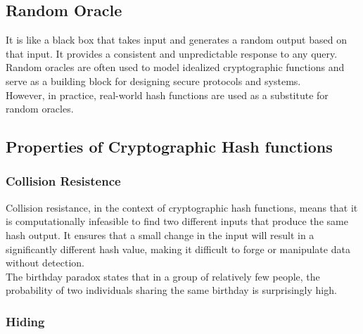 \documentclass{report}
\begin{document}
\subsection{Random Oracle}
It is like a black box that takes input and generates a random output based on that input. It provides a consistent and unpredictable response to any query. Random oracles are often used to model idealized cryptographic functions and serve as a building block for designing secure protocols and systems. \\
However, in practice, real-world hash functions are used as a substitute for random oracles.
\subsection{Properties of Cryptographic Hash functions}
\subsubsection{Collision Resistence}
Collision resistance, in the context of cryptographic hash functions, means that it is computationally infeasible to find two different inputs that produce the same hash output. It ensures that a small change in the input will result in a significantly different hash value, making it difficult to forge or manipulate data without detection. \\
The birthday paradox states that in a group of relatively few people, the probability of two individuals sharing the same birthday is surprisingly high.
\subsubsection{Hiding}
\end{document}
